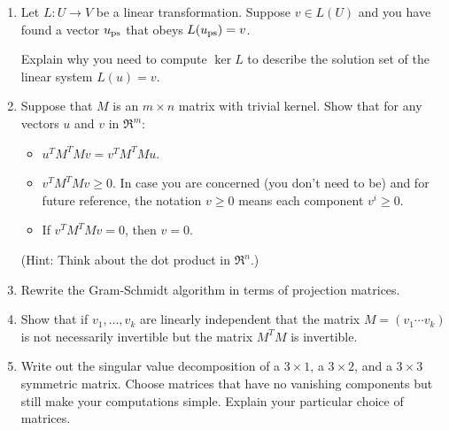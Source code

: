 
\begin{enumerate}
\item \label{kernalsolspaceprob} Let $L:U\rightarrow V$ be a linear transformation.  Suppose $v\in L(U)$ and you have found a vector $u_{\rm ps}$ that obeys $L(u_{\rm ps})=v$.

Explain why you need to compute $\ker L$ to describe the solution 
set %
of the linear system $L(u)=v$.


\item \label{problem:ls_prob2} Suppose that $M$ is an $m\times n$ matrix with trivial kernel.  Show that for any vectors $u$ and $v$ in $\Re^m$:
\begin{itemize}
\item $u^TM^TMv = v^TM^TMu$.
\item $v^TM^TMv \geq 0$. In case you are concerned (you don't need to be) and for future reference, the notation $v \geq 0$ means each component $v^i \geq 0$.
\item If $v^TM^TMv=0$, then $v=0$.
\end{itemize}
(Hint: Think about the dot product in $\Re^n$.)




\item Rewrite the Gram-Schmidt algorithm in terms of projection matrices. 

\item Show that if $v_1,\dots, v_k$ are linearly independent that  the matrix 
$M=(v_1 \cdots v_k)$ is not necessarily invertible but  the matrix $M^TM$ is invertible. 

\item Write out the singular value decomposition of a $3\times 1$, a $3\times 2$, and a $3\times 3$ symmetric matrix. 
Choose matrices that have no vanishing components but still make your computations simple. Explain your particular choice of matrices.


\end{enumerate}
